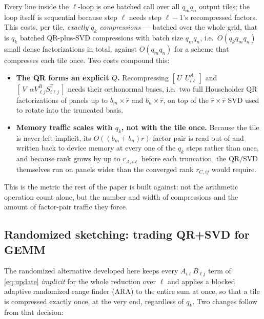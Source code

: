 \documentclass[11pt]{article}
\newcommand{\T}{\mathsf{T}}
\begin{document}
Every line inside the $\ell$-loop is one batched call over all $q_mq_n$ output
tiles; the loop itself is sequential because step $\ell$ needs step $\ell-1$'s
recompressed factors. This costs, per tile, \emph{exactly $q_k$ compressions}
--- batched over the whole grid, that is $q_k$ batched QR-plus-SVD
compressions with batch size $q_mq_n$, i.e.\ $O(q_kq_mq_n)$ small dense
factorizations in total, against $O(q_mq_n)$ for a scheme that compresses
each tile once. Two costs compound this:

\begin{itemize}
\item \textbf{The QR forms an explicit $Q$.} Recompressing
  $[\,U\ \ U^A_{i\ell}\,]$ and $[\,V\ \ \alpha V^B_{\ell j}S_{i\ell j}^{\T}\,]$
  needs their orthonormal bases, i.e.\ two full Householder QR factorizations
  of panels up to $b_m\times\hat r$ and $b_n\times\hat r$, on top of the
  $\hat r\times\hat r$ SVD used to rotate into the truncated basis.
\item \textbf{Memory traffic scales with $q_k$, not with the tile once.}
  Because the tile is never left implicit, its $O((b_m+b_n)r)$ factor pair is
  read out of and written back to device memory at every one of the $q_k$
  steps rather than once, and because rank grows by up to $r_{A,i\ell}$ before
  each truncation, the QR/SVD themselves run on panels wider than the
  converged rank $r_{C,ij}$ would require.
\end{itemize}

This is the metric the rest of the paper is built against: not the arithmetic
operation count alone, but the number and width of compressions and the
amount of factor-pair traffic they force.

\subsection{Randomized sketching: trading QR+SVD for GEMM}
\label{sec:randomized}

The randomized alternative developed here keeps every $A_{i\ell}B_{\ell j}$
term of \eqref{eq:update} \emph{implicit} for the whole reduction over $\ell$
and applies a blocked adaptive randomized range finder (ARA) to the entire sum
at once, so that a tile is compressed exactly once, at the very end,
regardless of $q_k$. Two changes follow from that decision:
\end{document}

